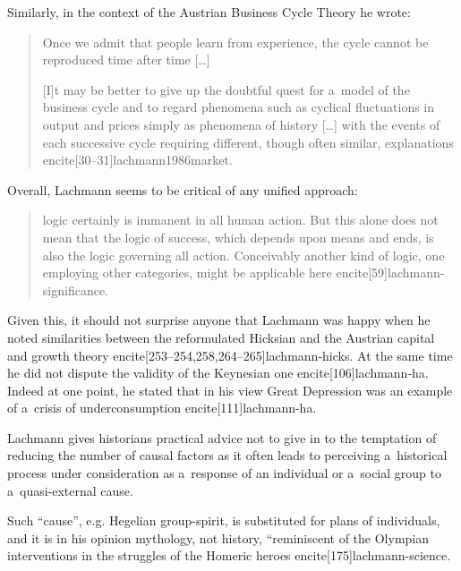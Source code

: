 {Similarly, in the context of the Austrian Business Cycle Theory he wrote:

\begin{quote}

Once we admit that people learn from experience, the cycle cannot be reproduced time after time [\ldots]

[I]t may be better to give up the doubtful quest for a~model of the business cycle and to regard phenomena such as cyclical fluctuations in output and prices simply as phenomena of history [\ldots] with the events of each successive cycle requiring different, though often similar, explanations encite[30--31]{lachmann1986market}.

\end{quote}

Overall, Lachmann seems to be critical of any unified approach:

\begin{quote}

logic certainly is immanent in all human action. But this alone does not mean that the logic of success, which depends upon means and ends, is also the logic governing all action. Conceivably another kind of logic, one employing other categories, might be applicable here encite[59]{lachmann-significance}.

\end{quote}



Given this, it should not surprise anyone that Lachmann was happy when he noted similarities between the reformulated Hicksian and the Austrian capital and growth theory encite[253--254,258,264--265]{lachmann-hicks}. At the same time he did not dispute the validity of the Keynesian one encite[106]{lachmann-ha}. Indeed at one point, he stated that in his view Great Depression was an example of a~crisis of underconsumption encite[111]{lachmann-ha}.



Lachmann gives historians practical advice not to give in to the temptation of reducing the number of causal factors as it often leads to perceiving a~historical process under consideration as a~response of an individual or a~social group to a~quasi-external cause.

Such ``cause'', e.g. Hegelian group-spirit, is substituted for plans of individuals, and it is in his opinion mythology, not history, ``reminiscent of the Olympian interventions in the struggles of the Homeric heroes encite[175]{lachmann-science}.

}
